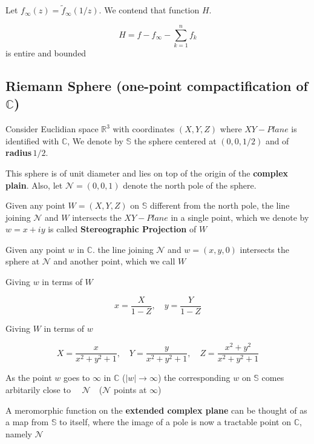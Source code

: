 \documentclass[11pt]{article}
\begin{document}
Let \(f_{\infty}(z)=\tilde{f}_{\infty}(1/z)\). We contend that function
\(H\).

\[H=f-f_{\infty}-\sum_{k=1}^{n}f_{k}\] is entire and bounded

    \subsection{\texorpdfstring{Riemann Sphere (one-point compactification
of
\(\mathbb{C}\))}{Riemann Sphere (one-point compactification of \textbackslash mathbb\{C\})}}\label{riemann-sphere-one-point-compactification-of-mathbbc}

Consider Euclidian space \(\mathbb{R}^{3}\) with coordinates \((X,Y,Z)\)
where \(XY-Plane\) is identified with \(\mathbb{C}\), We denote by
\(\mathbb{S}\) the sphere centered at \((0,0,1/2)\) and of
\textbf{radius}\(\,1/2\).

This sphere is of unit diameter and lies on top of the origin of the
\textbf{complex plain}. Also, let \(\mathcal{N}=(0,0,1)\) denote the
north pole of the sphere.

Given any point \(W=(X,Y,Z)\) on \(\mathbb{S}\) different from the north
pole, the line joining \(\mathcal{N}\) and \(W\) intersects the
\(XY-Plane\) in a single point, which we denote by \(w=x+iy\) is called
\textbf{Stereographic Projection} of \(W\)

Given any point \(w\) in \(\mathbb{C}\). the line joining
\(\mathcal{N}\) and \(w=(x,y,0)\) intersects the sphere at
\(\mathcal{N}\) and another point, which we call \(W\)

Giving \(w\) in terms of \(W\)

\[x=\dfrac{X}{1-Z},\quad y=\dfrac{Y}{1-Z}\]

Giving \(W\) in terms of \(w\)

\[X=\dfrac{x}{x^{2}+y^{2}+1},\quad Y=\dfrac{y}{x^{2}+y^{2}+1},\quad Z=\dfrac{x^{2}+y^{2}}{x^{2}+y^{2}+1}\]

As the point \(w\) goes to \(\infty\) in \(\mathbb{C}\)
(\(|w|\to\infty\)) the corresponding \(w\) on \(\mathbb{S}\) comes
arbitarily close to \(\quad\mathcal{N}\quad\)(\(\mathcal{N}\) points at
\(\infty\))

A meromorphic function on the \textbf{extended complex plane} can be
thought of as a map from \(\mathbb{S}\) to itself, where the image of a
pole is now a tractable point on \(\mathbb{C}\), namely \(\mathcal{N}\)
\end{document}

